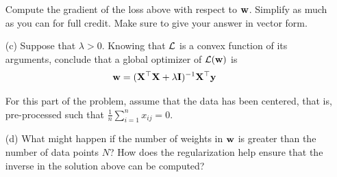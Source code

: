 \documentclass[submit]{harvardml}
\begin{document}
\begin{problem}
\begin{itemize}
Compute the gradient of the loss above with respect to $\mathbf{w}$.
Simplify as much as you can for full credit.  Make sure to give your
answer in vector form.

\item[(c)] Suppose that $\lambda > 0$. Knowing that $\mathcal{L}$ is a convex function
    of its arguments, conclude that a global optimizer of
    $\mathcal{L}(\mathbf{w})$ is
    \begin{align}
      \mathbf{w} &= (\mathbf{X}^\top \mathbf{X} + \lambda \mathbf{I})^{-1} \mathbf{X}^\top \mathbf{y}
    \end{align}

For this part of the problem, assume that the data has been centered,
that is, pre-processed such that $\frac{1}{n} \sum_{i=1}^n x_{ij} = 0
$.

\item[(d)] What might happen if the number of weights in $\mathbf{w}$ is
  greater than the number of data points $N$?  How does the
  regularization help ensure that the inverse in the solution above
  can be computed?

\end{itemize}

\end{problem}
\end{document}
